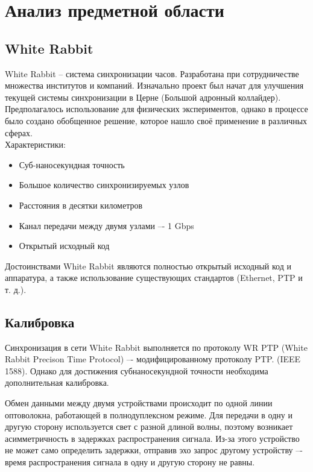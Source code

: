 \chapter{Анализ предметной области} \label{ch1}

\section{White Rabbit} \label{ch1:sec1}

White Rabbit -- система синхронизации часов. Разработана при сотрудничестве множества
институтов и компаний. Изначально проект был начат для улучшения текущей системы синхронизации в Церне (Большой адронный коллайдер).
Предполагалось использование для физических экспериментов, однако в процессе было создано обобщенное решение,
которое нашло своё применение в различных сферах.\\

\noindent Характеристики:

\begin{itemize}
	\item Суб-наносекундная точность
	\item Большое количество синхронизируемых узлов
	\item Расстояния в десятки километров
	\item Канал передачи между двумя узлами –- 1 Gbps
	\item Открытый исходный код\\
\end{itemize}

Достоинствами White Rabbit являются полностью открытый исходный код и аппаратура, а также 
использование существующих стандартов (Ethernet, PTP и т. д.).

\section{Калибровка}

Синхронизация в сети White Rabbit выполняется по протоколу WR PTP (White Rabbit Precison Time Protocol) –- модифицированному протоколу PTP. (IEEE 1588).
Однако для достижения субнаносекундной точности необходима дополнительная калибровка.

Обмен данными между двумя устройствами происходит по одной линии оптоволокна, работающей в полнодуплексном режиме.
Для передачи в одну и другую сторону используется свет с разной длиной волны, поэтому возникает асимметричность в
задержках распространения сигнала. Из-за этого устройство не может само определить задержки, отправив эхо запрос
другому устройству –- время распространения сигнала в одну и другую сторону не равны.

